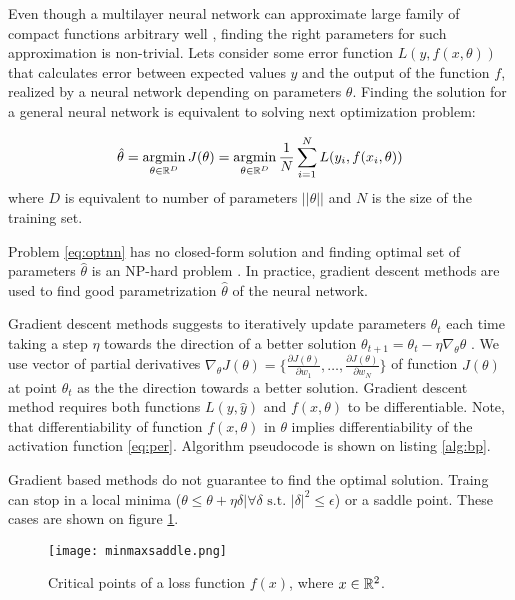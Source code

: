 Even though a multilayer neural network can approximate large family of compact functions arbitrary well \cite{Debao1993}, finding the right parameters for such approximation is non-trivial.
Lets consider some error function $L(y, f(x, \theta))$ that calculates error between expected values $y$ and the output of the function $f$, realized by a neural network depending on parameters $\theta$. Finding the solution for a general neural network is equivalent to solving next optimization problem:

\begin{equation}\label{eq:optnn}
  \hat{\theta} = \operatorname*{argmin}_{\theta \in \Bbb{R}^D} J(\theta) = \operatorname*{argmin}_{\theta \in \Bbb{R}^D} \frac{1}{N} \sum_{i=1}^{N} L(y_i, f(x_i, \theta))
\end{equation}
where $D$ is equivalent to number of parameters $||\theta||$ and $N$ is the size of the training set.

Problem \ref{eq:optnn} has no closed-form solution and finding optimal set of parameters $\hat{\theta}$ is an NP-hard problem \cite{Anandkumar16}.
In practice, gradient descent methods are used to find good parametrization $\hat{\theta}$ of the neural network.

Gradient descent methods suggests to iteratively update parameters $\theta_t$ each time taking a step $\eta$ towards the direction of a better solution $\theta_{t+1}=\theta_t - \eta \nabla_\theta \theta$ \cite{Cauchy1847}.
We use vector of partial derivatives $\nabla_\theta J(\theta)=\{ \frac{\partial J(\theta)}{\partial w_1}, \ldots, \frac{\partial J(\theta)}{\partial w_N} \}$ of function $J(\theta)$ at point $\theta_t$ as the the direction towards a better solution. Gradient descent method requires both functions $L(y, \hat{y})$ and $f(x, \theta)$ to be differentiable. Note, that differentiability of function $f(x, \theta)$ in $\theta$ implies differentiability of the activation function \ref{eq:per}. Algorithm pseudocode is shown on listing \ref{alg:bp}.



Gradient based methods do not guarantee to find the optimal solution.
Traing can stop in a local minima ($\theta \leq \theta + \eta \delta | \forall \delta \text{ s.t. } |\delta|^2 \leq \epsilon$) or a saddle point.
These cases are shown on figure \ref{fig:critical}.

\begin{figure}[h!]
  \centering
    \texttt{[image: minmaxsaddle.png]}
  \caption{Critical points of a loss function $f(x)$, where $x \in \Bbb{R}^2$.}
  \label{fig:critical}
\end{figure}

